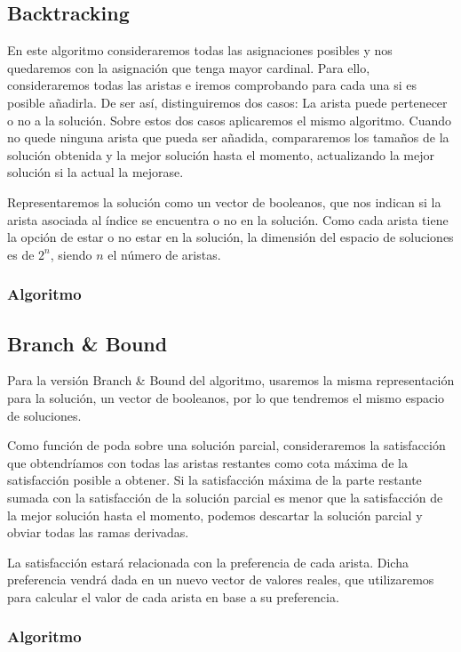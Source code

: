 \documentclass[a4paper, 11pt]{article} %
\begin{document}
        \subsection{Backtracking}
	  En este algoritmo consideraremos todas las asignaciones posibles y nos quedaremos con la asignación que tenga mayor cardinal. 
	  Para ello, consideraremos todas las aristas e iremos comprobando para cada una si es posible añadirla. De ser así, distinguiremos 
	  dos casos: La arista puede pertenecer o no a la solución. Sobre estos dos casos aplicaremos el mismo algoritmo. Cuando no quede
	  ninguna arista que pueda ser añadida, compararemos los tamaños de la solución obtenida y la mejor solución hasta el momento, 
	  actualizando la mejor solución si la actual la mejorase. 
	  
	  Representaremos la solución como un vector de booleanos, que nos indican si la arista asociada al índice se encuentra o 
	  no en la solución. Como cada arista tiene la opción de estar o no estar en la solución, la dimensión del espacio de 
	  soluciones es de $2^n$, siendo $n$ el número de aristas.
	  
	  \subsubsection{Algoritmo}
	    \small
	    \texttt{}
	    \normalsize
	  
        \subsection{Branch \& Bound}
	  Para la versión Branch \& Bound del algoritmo, usaremos la misma representación para la solución, 
	  un vector de booleanos, por lo que tendremos el mismo espacio de soluciones.
	  
	  Como función de poda sobre una solución parcial, consideraremos la satisfacción que obtendríamos con todas 
	  las aristas restantes como cota máxima de la satisfacción posible a obtener. Si la satisfacción máxima de 
	  la parte restante sumada con la satisfacción de la solución parcial es menor que la satisfacción de la mejor 
	  solución hasta el momento, podemos descartar la solución parcial y obviar todas las ramas derivadas. 
	  
	  La satisfacción estará relacionada con la preferencia de cada arista. Dicha preferencia vendrá dada en un 
	  nuevo vector de valores reales, que utilizaremos para calcular el valor de cada arista en base a su preferencia. 
        
        \subsubsection{Algoritmo}    
        \small
        \texttt{}
        \normalsize        
    
\end{document}

